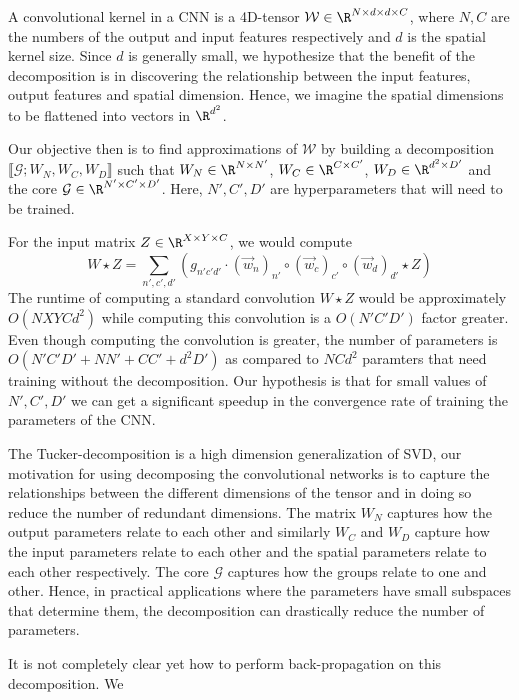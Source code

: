 \documentclass[a4paper]{article}
\newcommand{\Wc}{\mathcal{W}}
\begin{document}
A convolutional kernel in a CNN is a 4D-tensor $\Wc \in \R^{N \times d \times d \times C}$, where $N, C$ are the numbers of the output and input features respectively and $d$ is the spatial kernel size. Since $d$ is generally small, we hypothesize that the benefit of the decomposition is in discovering the relationship between the input features, output features and spatial dimension. Hence, we imagine the spatial dimensions to be flattened into vectors in $\R^{d^2}$. 

Our objective then is to find approximations of $\Wc$ by building a decomposition $\llbracket \mathcal{G}; W_N, W_C, W_D\rrbracket$ such that $W_N \in \R^{N \times N'}$, $W_C \in \R^{C \times C'}$, $W_D \in \R^{d^2 \times D'}$ and  the core $\mathcal{G} \in \R^{N' \times C' \times D'}$. Here, $N', C', D'$ are hyperparameters that will need to be trained.

For the input matrix $Z \in \R^{X \times Y \times C}$, we would compute 
$$W \star Z = \sum_{n', c', d'} \left( g_{n'c'd'} \cdot (\vec{w}_n)_{n'} \circ (\vec{w}_c)_{c'} \circ (\vec{w}_d)_{d'} \star Z \right)$$ 
The runtime of computing a standard convolution $W \star Z$ would be approximately $O(NXYCd^2)$ while computing this convolution is a $O(N'C'D')$ factor greater. Even though computing the convolution is greater, the number of parameters is $O(N'C'D' + NN' + CC' + d^2D')$ as compared to $NCd^2$ paramters that need training without the decomposition. Our hypothesis is that for small values of $N',C',D'$ we can get a significant speedup in the convergence rate of training the parameters of the CNN. 

The Tucker-decomposition is a high dimension generalization of \textsf{SVD}, our motivation for using decomposing the convolutional networks is to capture the relationships between the different dimensions of the tensor and in doing so reduce the number of redundant dimensions. The matrix $W_N$ captures how the output parameters relate to each other and similarly $W_C$ and $W_D$ capture how the input parameters relate to each other and the spatial parameters relate to each other respectively. The core $\mathcal{G}$ captures how the groups relate to one and other. Hence, in practical applications where the parameters have small subspaces that determine them, the decomposition can drastically reduce the number of parameters.

It is not completely clear yet how to perform back-propagation on this decomposition. We 
\end{document}
